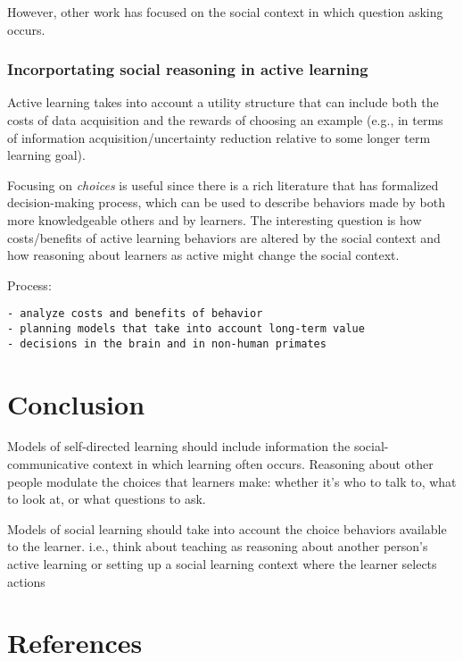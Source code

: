 \documentclass[a4paper,man,apacite,floatsintext]{apa6}
\begin{document}
However, other work has focused on the social context in which question
asking occurs.

\subsubsection{Incorportating social reasoning in active
learning}\label{incorportating-social-reasoning-in-active-learning}

Active learning takes into account a utility structure that can include
both the costs of data acquisition and the rewards of choosing an
example (e.g., in terms of information acquisition/uncertainty reduction
relative to some longer term learning goal).

Focusing on \emph{choices} is useful since there is a rich literature
that has formalized decision-making process, which can be used to
describe behaviors made by both more knowledgeable others and by
learners. The interesting question is how costs/benefits of active
learning behaviors are altered by the social context and how reasoning
about learners as active might change the social context.

Process:

\begin{verbatim}
- analyze costs and benefits of behavior
- planning models that take into account long-term value
- decisions in the brain and in non-human primates 
\end{verbatim}

\section{Conclusion}\label{conclusion}

Models of self-directed learning should include information the
social-communicative context in which learning often occurs. Reasoning
about other people modulate the choices that learners make: whether it's
who to talk to, what to look at, or what questions to ask.

Models of social learning should take into account the choice behaviors
available to the learner. i.e., think about teaching as reasoning about
another person's active learning or setting up a social learning context
where the learner selects actions

\newpage

\section{References}\label{references}
\end{document}
